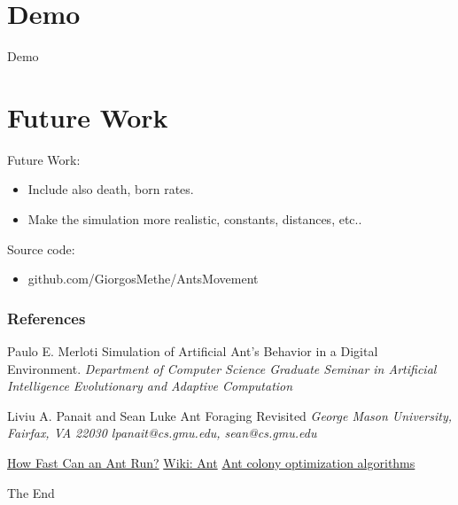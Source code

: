 \documentclass{beamer}
\begin{document}
\section{Demo}
\begin{frame}
\Huge{\centerline{Demo}}
\end{frame}

\section{Future Work}
\begin{frame}
Future Work:
\begin{itemize}
\item Include also death, born rates.
\item Make the simulation more realistic, constants, distances, etc..
\end{itemize}
Source code: 
\begin{itemize}
\item github.com/GiorgosMethe/AntsMovement
\end{itemize}
\end{frame}


\begin{frame}
\frametitle{References}
\footnotesize{
\begin{thebibliography}{99} %
 Paulo E. Merloti
\newblock Simulation of Artificial Ant’s Behavior 
in a Digital Environment.
\newblock \emph{Department of Computer Science 
Graduate Seminar in Artificial Intelligence 
Evolutionary and Adaptive Computation 
}

 Liviu A. Panait and Sean Luke
\newblock Ant Foraging Revisited
\newblock \emph{George Mason University, Fairfax, VA 22030
lpanait@cs.gmu.edu, sean@cs.gmu.edu
}




\href{http://www.ehow.com/about_5365350_fast-can-ant-run.html}{How Fast Can an Ant Run?}
\href{http://en.wikipedia.org/wiki/Ant}{Wiki: Ant}
\href{http://en.wikipedia.org/wiki/Ant_colony_optimization_algorithms}{Ant colony optimization algorithms}

\end{thebibliography}
}
\end{frame}


\begin{frame}
\Huge{\centerline{The End}}
\end{frame}

\end{document}
